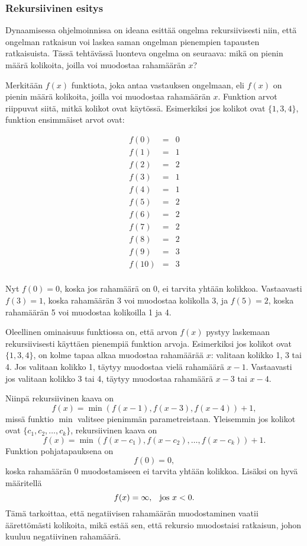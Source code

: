 \subsubsection{Rekursiivinen esitys}


Dynaamisessa ohjelmoinnissa on ideana esittää
ongelma rekursiivisesti niin,
että ongelman ratkaisun voi laskea
saman ongelman pienempien tapausten ratkaisuista.
Tässä tehtävässä luonteva ongelma on seuraava:
mikä on pienin määrä kolikoita,
joilla voi muodostaa rahamäärän $x$?

Merkitään $f(x)$ funktiota,
joka antaa vastauksen ongelmaan,
eli $f(x)$ on pienin määrä kolikoita,
joilla voi muodostaa rahamäärän $x$.
Funktion arvot riippuvat siitä,
mitkä kolikot ovat käytössä.
Esimerkiksi jos kolikot ovat $\{1,3,4\}$,
funktion ensimmäiset arvot ovat:

\[
\begin{array}{lcl}
f(0) & = & 0 \\
f(1) & = & 1 \\
f(2) & = & 2 \\
f(3) & = & 1 \\
f(4) & = & 1 \\
f(5) & = & 2 \\
f(6) & = & 2 \\
f(7) & = & 2 \\
f(8) & = & 2 \\
f(9) & = & 3 \\
f(10) & = & 3 \\
\end{array}
\]

Nyt $f(0)=0$, koska jos rahamäärä on 0,
ei tarvita yhtään kolikkoa.
Vastaavasti $f(3)=1$, koska rahamäärän 3
voi muodostaa kolikolla 3,
ja $f(5)=2$, koska rahamäärän 5
voi muodostaa kolikoilla 1 ja 4.

Oleellinen ominaisuus funktiossa on,
että arvon $f(x)$ pystyy laskemaan
rekursiivisesti käyttäen pienempiä
funktion arvoja.
Esimerkiksi jos kolikot ovat $\{1,3,4\}$,
on kolme tapaa alkaa muodostaa rahamäärää $x$:
valitaan kolikko 1, 3 tai 4.
Jos valitaan kolikko 1, täytyy
muodostaa vielä rahamäärä $x-1$.
Vastaavasti jos valitaan kolikko 3 tai 4,
täytyy muodostaa rahamäärä $x-3$ tai $x-4$.

Niinpä rekursiivinen kaava on
\[f(x) = \min(f(x-1),f(x-3),f(x-4))+1,\]
missä funktio $\min$ valitsee pienimmän parametreistaan.
Yleisemmin jos kolikot ovat $\{c_1,c_2,\ldots,c_k\}$,
rekursiivinen kaava on
\[f(x) = \min(f(x-c_1),f(x-c_2),\ldots,f(x-c_k))+1.\]
Funktion pohjatapauksena on
\[f(0)=0,\]
koska rahamäärän 0 muodostamiseen ei tarvita
yhtään kolikkoa.
Lisäksi on hyvä määritellä
\[f(x)=\infty,\hspace{8px}\textrm{jos $x<0$}.\]
Tämä tarkoittaa, että negatiivisen rahamäärän
muodostaminen vaatii äärettömästi kolikoita,
mikä estää sen, että rekursio muodostaisi
ratkaisun, johon kuuluu negatiivinen rahamäärä.

